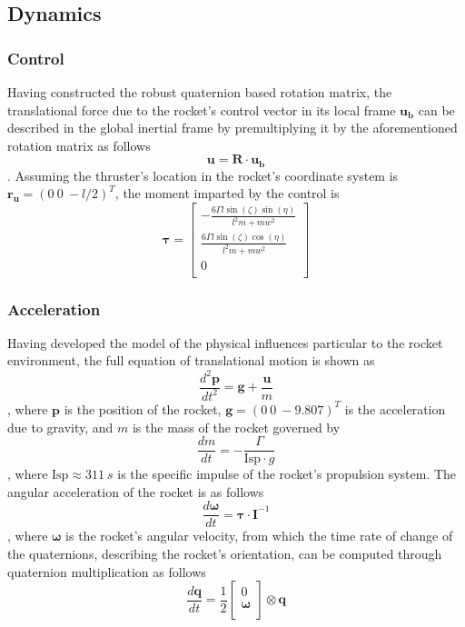 \documentclass{article}
\begin{document}
\subsection{Dynamics}\label{dynamics}
\subsubsection{Control}
Having constructed the robust quaternion based rotation matrix, the translational force due to the rocket's control vector in its local frame $\mathbf{u_b}$ can be described in the global inertial frame by premultiplying it by the aforementioned rotation matrix as follows
$$
\mathbf{u} = \mathbf{R}\cdot \mathbf{u_b}
$$.
Assuming the thruster's location in the rocket's coordinate system is $\mathbf{r_u}=\left(0~0~-l/2\right)^T$, the moment imparted by the control is
$$
\mathbf{\tau} = \left[
\begin{array}{c}
 -\frac{6 \Gamma  l \sin (\zeta ) \sin (\eta )}{l^2 m+m w^2} \\
 \frac{6 \Gamma  l \sin (\zeta ) \cos (\eta )}{l^2 m+m w^2} \\
 0 \\
\end{array}
\right]
$$

\subsubsection{Acceleration}
Having developed the model of the physical influences particular to the rocket environment, the full equation of translational motion is shown as 
$$
\frac{d^2\mathbf{p}}{dt^2} = \mathbf{g} + \frac{\mathbf{u}}{m}
$$
, where $\mathbf{p}$ is the position of the rocket, $\mathbf{g}=\left(0~0~-9.807\right)^T$ is the acceleration due to gravity, and $m$ is the mass of the rocket governed by
$$
\frac{dm}{dt} = -\frac{\Gamma}{\text{Isp}\cdot g}
$$,
where $\text{Isp}\approx 311~s$ is the specific impulse of the rocket's propulsion system. The angular acceleration of the rocket is as follows
$$
\frac{d\mathbf{\omega}}{dt} = \mathbf{\tau}\cdot \mathbf{I}^{-1}
$$,
where $\mathbf{\omega}$ is the rocket's angular velocity, from which the time rate of change of the quaternions, describing the rocket's orientation, can be computed through quaternion multiplication as follows
$$
\frac{d\mathbf{q}}{dt} = \frac{1}{2}
\left[
\begin{array}{c}
 0 \\
\mathbf{\omega} \\
\end{array}
\right] \otimes \mathbf{q}
$$
\end{document}

